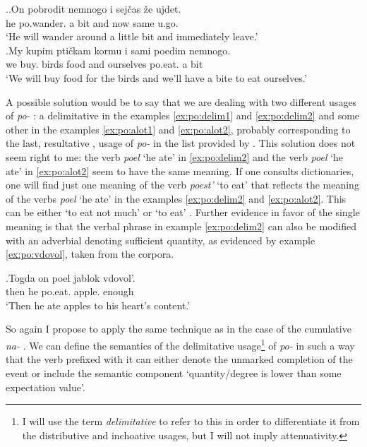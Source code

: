 \ex.\label{ex:po:abit}\ag.On pobrodit nemnogo i sej\v{c}as \v{z}e ujdet.\\
he po.wander. {a bit} and now same u.go.\\
\trans `He will wander around a little bit and immediately leave.'\\
\bg.My kupim pti\v{c}kam kormu i sami poedim nemnogo.\\
we buy. birds food and ourselves po.eat. {a bit}\\
\trans `We will buy food for the birds and we'll have a bite to eat ourselves.'\\

A possible solution would be to say that we are dealing with two different usages of \textit{po-}  : a delimitative  in the examples \ref{ex:po:delim1} and \ref{ex:po:delim2} and some other in the examples \ref{ex:po:alot1} and \ref{ex:po:alot2}, probably corresponding to the last, resultative , usage of \textit{po-}   in the list provided by \citet{Shvedova:82}. This solution does not seem right to me: the verb \textit{poel} `he ate' in \ref{ex:po:delim2} and the verb \textit{poel} `he ate' in \ref{ex:po:alot2} seem to have the same meaning. If one consults dictionaries, one will find just one meaning of the verb \textit{poest'} `to eat' that reflects the meaning of the verbs \textit{poel} `he ate' in the examples \ref{ex:po:delim2} and \ref{ex:po:alot2}. This can be either `to eat not much' \citep{Ushakov:50} or `to eat' \citep{Efremova:00}. Further evidence in favor of the single meaning is that the verbal phrase in example \ref{ex:po:delim2} can also be modified with an adverbial denoting sufficient quantity, as evidenced by example \ref{ex:po:vdovol}, taken from the corpora.

\exg.\label{ex:po:vdovol}Togda on poel jablok vdovol'.\\
then he po.eat. apple. enough\\
\trans `Then he ate apples to his heart's content.'\\

So again I propose to apply the same technique as in the case of the cumulative  \textit{na-}  . We can define the semantics of the delimitative  usage\footnote{I will use the term \textit{delimitative } to refer to this in order to differentiate it from the distributive  and inchoative  usages, but I will not imply attenuativity.} of \textit{po-}   in such a way that the verb prefixed with it can either denote the unmarked completion of the event or include the semantic component `quantity/degree is lower than some expectation value'. 

